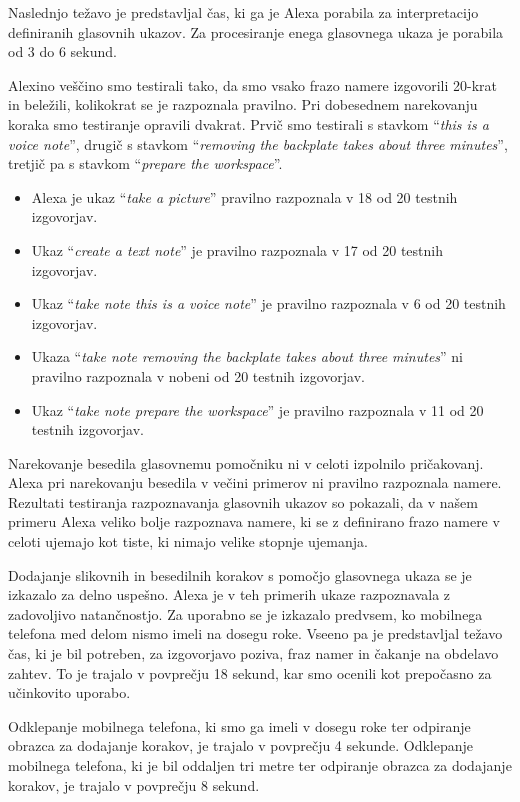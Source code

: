\documentclass[a4paper, 12pt]{book}
\begin{document}
Naslednjo težavo je predstavljal čas, ki ga je Alexa porabila za interpretacijo definiranih glasovnih ukazov.
Za procesiranje enega glasovnega ukaza je porabila od 3 do 6 sekund.


Alexino veščino smo testirali tako, da smo vsako frazo namere izgovorili 20-krat in beležili, kolikokrat se je razpoznala pravilno.
Pri dobesednem narekovanju koraka smo testiranje opravili dvakrat.
Prvič smo testirali s stavkom \enquote{\textit{this is a voice note}}, drugič s stavkom \enquote{\textit{removing the backplate takes about three minutes}}, tretjič pa s stavkom \enquote{\textit{prepare the workspace}}.
\begin{itemize}
	\item Alexa je ukaz \enquote{\textit{take a picture}} pravilno razpoznala v 18 od 20 testnih izgovorjav.
	\item Ukaz \enquote{\textit{create a text note}} je pravilno razpoznala v 17 od 20 testnih izgovorjav.
	\item Ukaz \enquote{\textit{take note this is a voice note}} je pravilno razpoznala v 6 od 20 testnih izgovorjav.
	\item Ukaza \enquote{\textit{take note removing the backplate takes about three minutes}} ni pravilno razpoznala v nobeni od 20 testnih izgovorjav.
	\item Ukaz \enquote{\textit{take note prepare the workspace}} je pravilno razpoznala v 11 od 20 testnih izgovorjav.
\end{itemize}
Narekovanje besedila glasovnemu pomočniku ni v celoti izpolnilo pričakovanj.
Alexa pri narekovanju besedila v večini primerov ni pravilno razpoznala namere.
Rezultati testiranja razpoznavanja glasovnih ukazov so pokazali, da v našem primeru Alexa veliko bolje razpoznava namere, ki se z definirano frazo namere v celoti ujemajo kot tiste, ki nimajo velike stopnje ujemanja.

Dodajanje slikovnih in besedilnih korakov s pomočjo glasovnega ukaza se je izkazalo za delno uspešno.
Alexa je v teh primerih ukaze razpoznavala z zadovoljivo natančnostjo.
Za uporabno se je izkazalo predvsem, ko mobilnega telefona med delom nismo imeli na dosegu roke.
Vseeno pa je predstavljal težavo čas, ki je bil potreben, za izgovorjavo poziva, fraz namer in čakanje na obdelavo zahtev.
To je trajalo v povprečju 18 sekund, kar smo ocenili kot prepočasno za učinkovito uporabo.

Odklepanje mobilnega telefona, ki smo ga imeli v dosegu roke ter odpiranje obrazca za dodajanje korakov, je trajalo v povprečju 4 sekunde.
Odklepanje mobilnega telefona, ki je bil oddaljen tri metre ter odpiranje obrazca za dodajanje korakov, je trajalo v povprečju 8 sekund.
\end{document}
